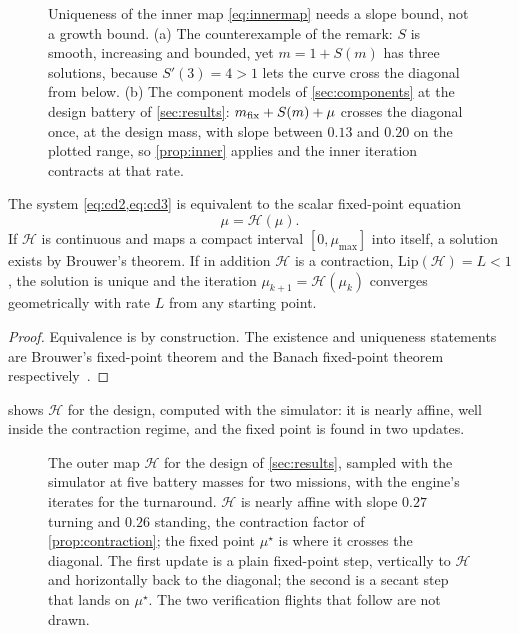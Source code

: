 \begin{figure}[tbp]
\centering

\caption{Uniqueness of the inner map \cref{eq:innermap} needs a slope bound,
not a growth bound. (a) The counterexample of the remark: $S$ is smooth,
increasing and bounded, yet $m=1+S(m)$ has three solutions, because
$S'(3)=4>1$ lets the curve cross the diagonal from below. (b) The component
models of \cref{sec:components} at the design battery of \cref{sec:results}:
$m_{\mathrm{fix}}+S(m)+\mu$ crosses the diagonal once, at the design mass, with slope
between $0.13$ and $0.20$ on the plotted range, so \cref{prop:inner} applies
and the inner iteration contracts at that rate.}
\label{fig:innermap}
\end{figure}

\begin{theorem}
\label{thm:codesignfixed}
The system \cref{eq:cd2,eq:cd3} is equivalent to the scalar fixed-point equation
\begin{equation}
  \mu = \mathcal{H}(\mu) .
  \label{eq:fixedpoint}
\end{equation}
If $\mathcal{H}$ is continuous and maps a compact interval $[0,\mu_{\max}]$ into
itself, a solution exists by Brouwer's theorem. If in addition $\mathcal{H}$ is
a contraction, $\mathrm{Lip}(\mathcal{H}) = L < 1$, the solution is unique and
the iteration $\mu_{k+1}=\mathcal{H}(\mu_k)$ converges geometrically with rate
$L$ from any starting point.
\end{theorem}

\begin{proof}
Equivalence is by construction. The existence and uniqueness statements are
Brouwer's fixed-point theorem and the Banach fixed-point theorem
respectively~\cite[Ch.~5]{ortega1970}.
\end{proof}

 shows $\mathcal H$ for the design, computed with the
simulator: it is nearly affine, well inside the contraction regime, and the
fixed point is found in two updates.

\begin{figure}[tbp]
\centering

\caption{The outer map $\mathcal H$ for the design of \cref{sec:results},
sampled with the simulator at five battery masses for two missions, with the
engine's iterates for the turnaround. $\mathcal H$ is nearly affine with slope
$0.27$ turning and $0.26$ standing, the contraction factor of
\cref{prop:contraction}; the fixed point $\mu^\star$ is where it crosses the
diagonal. The first update is a plain fixed-point step, vertically to
$\mathcal H$ and horizontally back to the diagonal; the second is a secant step
that lands on $\mu^\star$. The two verification flights that follow are not
drawn.}
\label{fig:fixedpoint}
\end{figure}


